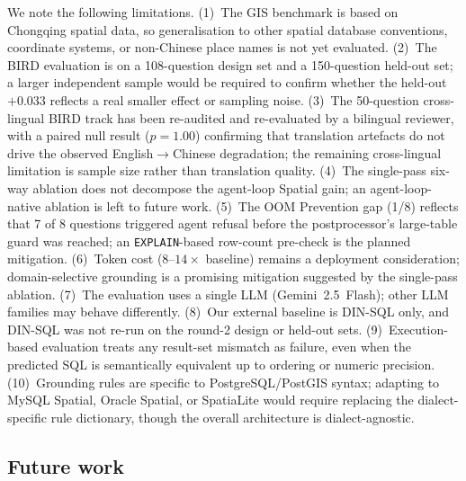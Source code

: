 \documentclass[11pt]{article}
\begin{document}
We note the following limitations. (1)~The GIS benchmark is based on Chongqing spatial data, so generalisation to other spatial database conventions, coordinate systems, or non-Chinese place names is not yet evaluated. (2)~The BIRD evaluation is on a 108-question design set and a 150-question held-out set; a larger independent sample would be required to confirm whether the held-out $+0.033$ reflects a real smaller effect or sampling noise. (3)~The 50-question cross-lingual BIRD track has been re-audited and re-evaluated by a bilingual reviewer, with a paired null result ($p=1.00$) confirming that translation artefacts do not drive the observed English$\to$Chinese degradation; the remaining cross-lingual limitation is sample size rather than translation quality. (4)~The single-pass six-way ablation does not decompose the agent-loop Spatial gain; an agent-loop-native ablation is left to future work. (5)~The OOM Prevention gap (1/8) reflects that 7 of 8 questions triggered agent refusal before the postprocessor's large-table guard was reached; an \texttt{EXPLAIN}-based row-count pre-check is the planned mitigation. (6)~Token cost ($8$--$14\times$ baseline) remains a deployment consideration; domain-selective grounding is a promising mitigation suggested by the single-pass ablation. (7)~The evaluation uses a single LLM (Gemini~2.5~Flash); other LLM families may behave differently. (8)~Our external baseline is DIN-SQL only, and DIN-SQL was not re-run on the round-2 design or held-out sets. (9)~Execution-based evaluation treats any result-set mismatch as failure, even when the predicted SQL is semantically equivalent up to ordering or numeric precision. (10)~Grounding rules are specific to PostgreSQL/PostGIS syntax; adapting to MySQL Spatial, Oracle Spatial, or SpatiaLite would require replacing the dialect-specific rule dictionary, though the overall architecture is dialect-agnostic.

\subsection{Future work}
\end{document}
